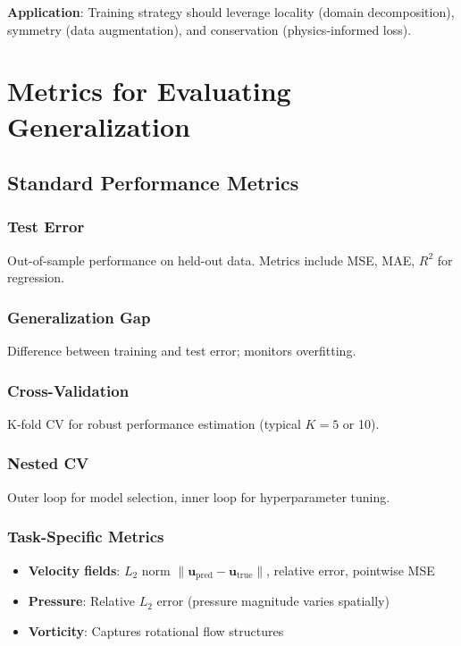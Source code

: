 \textbf{Application}: Training strategy should leverage locality (domain decomposition), symmetry (data augmentation), and conservation (physics-informed loss).

\chapter{Metrics for Evaluating Generalization}

\section{Standard Performance Metrics}

\subsection{Test Error}
Out-of-sample performance on held-out data. Metrics include MSE, MAE, $R^2$ for regression.

\subsection{Generalization Gap}
Difference between training and test error; monitors overfitting.

\subsection{Cross-Validation}
K-fold CV for robust performance estimation (typical $K=5$ or 10).

\subsection{Nested CV}
Outer loop for model selection, inner loop for hyperparameter tuning.

\subsection{Task-Specific Metrics}
\begin{itemize}
    \item \textbf{Velocity fields}: $L_2$ norm $\|\mathbf{u}_{\text{pred}} - \mathbf{u}_{\text{true}}\|$, relative error, pointwise MSE
    \item \textbf{Pressure}: Relative $L_2$ error (pressure magnitude varies spatially)
    \item \textbf{Vorticity}: Captures rotational flow structures
\end{itemize}

